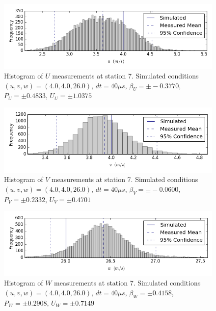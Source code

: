 \begin{figure}[H]
\centering
\includegraphics[width=6in]{figs/Ely_May28th07002/uncertainty_Ely_May28th07002_U}
\caption{Histogram of $U$ measurements at station 7. Simulated conditions $(u,v,w)=(4.0, 4.0, 26.0)$, $dt=40 \mu s$, $\beta_U=\pm -0.3770$, $P_U=\pm 0.4833$, $U_U=\pm 1.0375$}
\label{fig:uncertainty_Ely_May28th07002_U}
\end{figure}


\begin{figure}[H]
\centering
\includegraphics[width=6in]{figs/Ely_May28th07002/uncertainty_Ely_May28th07002_V}
\caption{Histogram of $V$ measurements at station 7. Simulated conditions $(u,v,w)=(4.0, 4.0, 26.0)$, $dt=40 \mu s$, $\beta_V=\pm -0.0600$, $P_V=\pm 0.2332$, $U_V=\pm 0.4701$}
\label{fig:uncertainty_Ely_May28th07002_V}
\end{figure}


\begin{figure}[H]
\centering
\includegraphics[width=6in]{figs/Ely_May28th07002/uncertainty_Ely_May28th07002_W}
\caption{Histogram of $W$ measurements at station 7. Simulated conditions $(u,v,w)=(4.0, 4.0, 26.0)$, $dt=40 \mu s$, $\beta_W=\pm 0.4158$, $P_W=\pm 0.2908$, $U_W=\pm 0.7149$}
\label{fig:uncertainty_Ely_May28th07002_W}
\end{figure}


